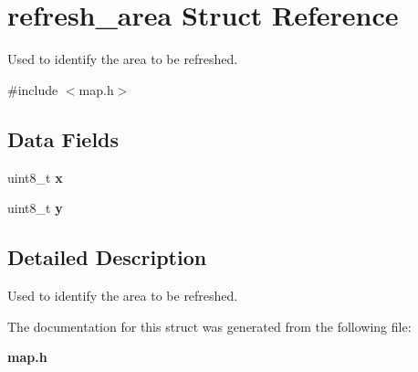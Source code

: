 \section{refresh\+\_\+area Struct Reference}
\label{structrefresh__area}


Used to identify the area to be refreshed.  




{\ttfamily \#include $<$map.\+h$>$}

\subsection*{Data Fields}
\begin{DoxyCompactItemize}
\item 
uint8\+\_\+t {\bfseries x}\label{structrefresh__area_a0f561e77fa0f040b637f4e04f6cd8078}

\item 
uint8\+\_\+t {\bfseries y}\label{structrefresh__area_a17f97f62d93bc8cfb4a2b5d273a2aa72}

\end{DoxyCompactItemize}


\subsection{Detailed Description}
Used to identify the area to be refreshed. 

The documentation for this struct was generated from the following file\+:\begin{DoxyCompactItemize}
\item 
{\bf map.\+h}\end{DoxyCompactItemize}
